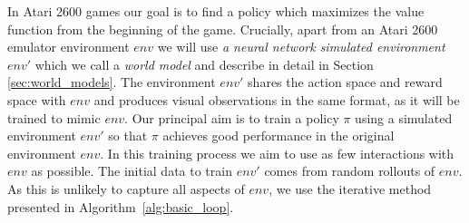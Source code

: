 In Atari 2600 games our goal is to find a policy which maximizes the value function from the beginning of the game.
Crucially, apart from an Atari 2600 emulator environment $env$ we will use \textit{a neural network simulated environment} $env'$ which we call a \textit{world model} and describe in detail in Section \ref{sec:world_models}. The environment $env'$ shares the action space and reward space with $env$ and produces visual observations in the same format, as it will be trained to mimic $env$.  Our principal aim is to
train a policy $\pi$ using a simulated environment $env'$ so that $\pi$ achieves good performance in the original environment $env$. In this training process we aim to use as few interactions with $env$ as possible. 
The initial data to train $env'$ comes from random rollouts of $env$. As this is unlikely to capture all aspects of $env$, we use the iterative method presented in Algorithm~\ref{alg:basic_loop}.